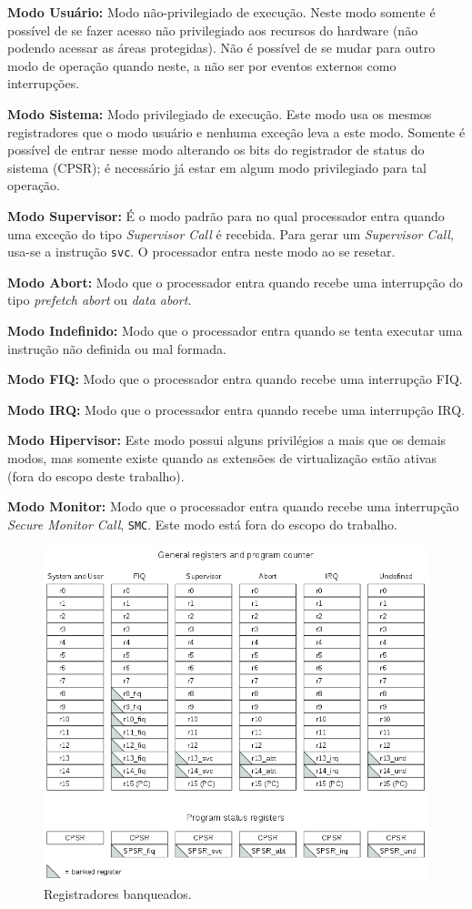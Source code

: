 \textbf{Modo Usuário:} Modo não-privilegiado de execução. Neste modo somente é possível de se fazer acesso não privilegiado aos recursos do hardware (não podendo acessar as áreas protegidas). Não é possível de se mudar para outro modo de operação quando neste, a não ser por eventos externos como interrupções.

\textbf{Modo Sistema:} Modo privilegiado de execução. Este modo usa os mesmos registradores que o modo usuário e nenhuma exceção leva a este modo. Somente é possível de entrar nesse modo alterando os bits do registrador de status do sistema (CPSR); é necessário já estar em algum modo privilegiado para tal operação.

\textbf{Modo Supervisor:} É o modo padrão para no qual processador entra quando uma exceção do tipo \emph{Supervisor Call} é recebida.
Para gerar um \emph{Supervisor Call}, usa-se a instrução \verb+svc+. O processador entra neste modo ao se resetar.

\textbf{Modo Abort:} Modo que o processador entra quando recebe uma interrupção do tipo \emph{prefetch abort} ou \emph{data abort}.

\textbf{Modo Indefinido:} Modo que o processador entra quando se tenta executar uma instrução não definida ou mal formada.

\textbf{Modo FIQ:} Modo que o processador entra quando recebe uma interrupção FIQ.

\textbf{Modo IRQ:} Modo que o processador entra quando recebe uma interrupção IRQ.

\textbf{Modo Hipervisor:} Este modo possui alguns privilégios a mais que os demais modos, mas somente existe quando as extensões de virtualização estão ativas (fora do escopo deste trabalho).

\textbf{Modo Monitor:} Modo que o processador entra quando recebe uma interrupção \emph{Secure Monitor Call}, \verb+SMC+. Este modo está fora do escopo do trabalho.


\begin{figure}[ht!]
	\centerline{
    \includegraphics[width=12cm]{figuras/banked_registers}
	}
    \caption{Registradores banqueados.}
	\label{fig:banked}
\end{figure}



